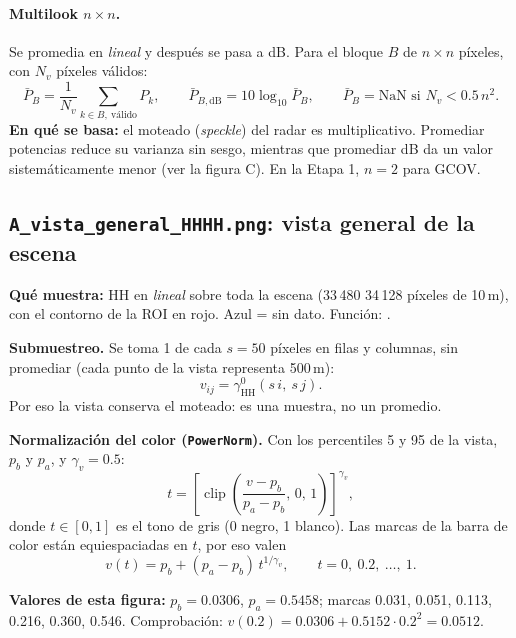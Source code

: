 \documentclass[11pt,a4paper]{article}
\begin{document}
\paragraph{Multilook $n\times n$.} Se promedia en \emph{lineal} y después se pasa a dB. Para el bloque $B$ de $n\times n$ píxeles, con
$N_v$ píxeles válidos:
\begin{equation}
  \bar{P}_B = \frac{1}{N_v}\sum_{k \in B,\ \text{válido}} P_k,
  \qquad
  \bar{P}_{B,\text{dB}} = 10\log_{10}\bar{P}_B,
  \qquad
  \bar{P}_B = \text{NaN si } N_v < 0.5\,n^2 .
  \label{eq:multilook}
\end{equation}
\textbf{En qué se basa:} el moteado (\emph{speckle}) del radar es multiplicativo. Promediar potencias reduce su varianza sin sesgo,
mientras que promediar dB da un valor sistemáticamente menor (ver la figura C). En la Etapa 1, $n = 2$ para GCOV.

\subsection{\texttt{A\_vista\_general\_HHHH.png}: vista general de la escena}

\textbf{Qué muestra:} \gz{} HH en \emph{lineal} sobre toda la escena (33\,480\,\por\,34\,128 píxeles de 10\,m), con el contorno de la
ROI en rojo. Azul = sin dato. Función: .

\textbf{Submuestreo.} Se toma 1 de cada $s = 50$ píxeles en filas y columnas, sin promediar (cada punto de la vista representa 500\,m):
\begin{equation}
  v_{ij} = \gamma^0_{\text{HH}}(s\,i,\ s\,j).
\end{equation}
Por eso la vista conserva el moteado: es una muestra, no un promedio.

\textbf{Normalización del color (\texttt{PowerNorm}).} Con los percentiles 5 y 95 de la vista, $p_b$ y $p_a$, y $\gamma_v = 0.5$:
\begin{equation}
  t = \left[\operatorname{clip}\!\left(\frac{v - p_b}{p_a - p_b},\, 0,\, 1\right)\right]^{\gamma_v},
\end{equation}
donde $t\in[0,1]$ es el tono de gris (0 negro, 1 blanco). Las marcas de la barra de color están equiespaciadas en $t$, por eso valen
\begin{equation}
  v(t) = p_b + (p_a - p_b)\, t^{1/\gamma_v}, \qquad t = 0,\ 0.2,\ \ldots,\ 1 .
\end{equation}

\textbf{Valores de esta figura:} $p_b = 0.0306$, $p_a = 0.5458$; marcas 0.031, 0.051, 0.113, 0.216, 0.360, 0.546. Comprobación:
$v(0.2) = 0.0306 + 0.5152\cdot 0.2^{2} = 0.0512$.
\end{document}
